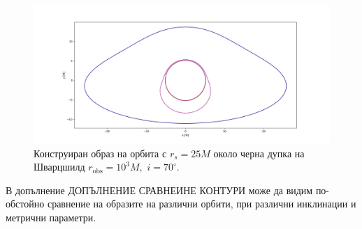 \begin{figure}[h]
	\centering
	\includegraphics[scale = 0.3]{Schw_70_deg_r25.png}
	\caption[Конструиран образ на орбита с $r_s = 25M$ около черна дупка на Шварцшилд.]{\small Конструиран образ на орбита с $r_s = 25M$ около черна дупка на Шварцшилд $r_\text{obs} = 10^3M,\,\,i = 70^\circ$.} 
	\label{Scw_r25_orbit}
\end{figure}

В допълнение ДОПЪЛНЕНИЕ СРАВНЕИНЕ КОНТУРИ може да видим по-обстойно сравнение на образите на различни орбити, при различни инклинации и метрични параметри.


\newpage

